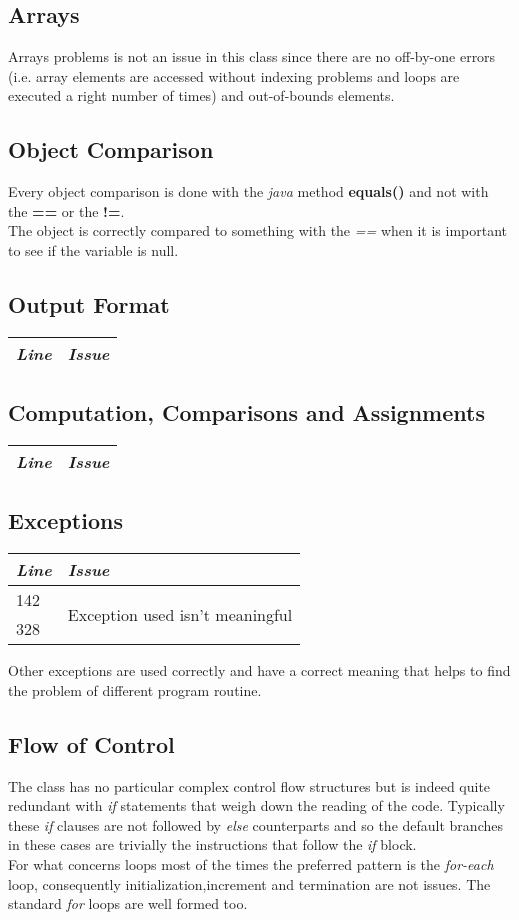 \documentclass[11pt,a4paper]{report}
\begin{document}
\subsection{Arrays}
Arrays problems is not an issue in this class since there are no off-by-one errors (i.e. array elements are accessed without indexing problems and loops are executed a right number of times) and out-of-bounds elements.
\subsection{Object Comparison}
Every object comparison is done with the \textit{java} method \textbf{equals()} and not with the \textbf{==} or the \textbf{!=}.\\The object is correctly compared to something with the \textit{==} when it is important to see if the variable is null.
\subsection{Output Format}
\begin{tabularx}{\textwidth}{|l|X|}
	\hline
	\textit{Line} & \textit{Issue}\\
	\hline
\end{tabularx}
\subsection{Computation, Comparisons and Assignments}
\begin{tabularx}{\textwidth}{|l|X|}
	\hline
	\textit{Line} & \textit{Issue}\\
	\hline
\end{tabularx}
\subsection{Exceptions}
\begin{tabularx}{\textwidth}{|l|X|}
	\hline
	\textit{Line} & \textit{Issue}\\
	\hline
	142 & \multirow{2}{*}{Exception used isn't meaningful}\\
	328 & \\
	\hline
\end{tabularx}
Other exceptions are used correctly and have a correct meaning that helps to find the problem of different program routine.
\subsection{Flow of Control}
The class has no particular complex control flow structures but is indeed quite redundant with \textit{if} statements that weigh down the reading of the code. Typically these \textit{if} clauses are not followed by \textit{else} counterparts and so the default branches in these cases are trivially the instructions that follow the \textit{if} block.\\For what concerns loops most of the times the preferred pattern is the \textit{for-each} loop, consequently initialization,increment and termination are not issues. The standard \textit{for} loops are well formed too.
\end{document}
